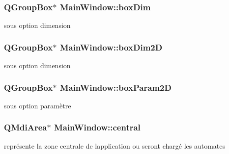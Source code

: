 \subsubsection[{\texorpdfstring{box\+Dim}{boxDim}}]{\setlength{\rightskip}{0pt plus 5cm}Q\+Group\+Box$\ast$ Main\+Window\+::box\+Dim\hspace{0.3cm}{\ttfamily [private]}}\hypertarget{class_main_window_a69406bb359d08dd42c0a05957ae89b51}{}\label{class_main_window_a69406bb359d08dd42c0a05957ae89b51}
sous option dimension 
\subsubsection[{\texorpdfstring{box\+Dim2D}{boxDim2D}}]{\setlength{\rightskip}{0pt plus 5cm}Q\+Group\+Box$\ast$ Main\+Window\+::box\+Dim2D\hspace{0.3cm}{\ttfamily [private]}}\hypertarget{class_main_window_ad25e047b431ec6c6d244c9d4a3355582}{}\label{class_main_window_ad25e047b431ec6c6d244c9d4a3355582}
sous option dimension 
\subsubsection[{\texorpdfstring{box\+Param2D}{boxParam2D}}]{\setlength{\rightskip}{0pt plus 5cm}Q\+Group\+Box$\ast$ Main\+Window\+::box\+Param2D\hspace{0.3cm}{\ttfamily [private]}}\hypertarget{class_main_window_aa758e230a66e84a946b125af5df55618}{}\label{class_main_window_aa758e230a66e84a946b125af5df55618}
sous option paramètre 
\subsubsection[{\texorpdfstring{central}{central}}]{\setlength{\rightskip}{0pt plus 5cm}Q\+Mdi\+Area$\ast$ Main\+Window\+::central\hspace{0.3cm}{\ttfamily [private]}}\hypertarget{class_main_window_a9c7c0dfa79f78e05a3745962c680cd18}{}\label{class_main_window_a9c7c0dfa79f78e05a3745962c680cd18}
représente la zone centrale de l\textquotesingle{}application ou seront chargé les automates 
